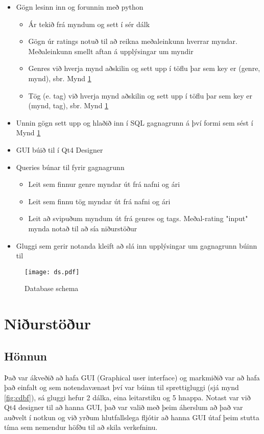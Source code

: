 \documentclass[12pt, git, draft]{rureport}
\begin{document}
\begin{itemize}
	\item Gögn lesinn inn og forunnin með python
	\begin{itemize}
		\item Ár tekið frá myndum og sett í sér dálk
		\item Gögn úr ratings notuð til að reikna meðaleinkunn hverrar myndar. Meðaleinkunn smellt aftan á upplýsingar um myndir
		\item Genres við hverja mynd aðskilin og sett upp í töflu þar sem key er (genre, mynd), sbr. Mynd \ref{fig:dataschema}
		\item Tög (e. tag) við hverja mynd aðskilin og sett upp í töflu þar sem key er (mynd, tag), sbr. Mynd \ref{fig:dataschema}
	\end{itemize}
	\item Unnin gögn sett upp og hlaðið inn í SQL gagnagrunn á því formi sem sést í Mynd \ref{fig:dataschema}
	\item GUI búið til í Qt4 Designer \cite{qt4}
	\item Queries búnar til fyrir gagnagrunn
	\begin{itemize}
		\item Leit sem finnur genre myndar út frá nafni og ári
		\item Leit sem finnu tög myndar út frá nafni og ári
		\item Leit að svipuðum myndum út frá genres og tags. Meðal-rating "input" mynda notað til að sía niðurstöður
	\end{itemize}
	\item Gluggi sem gerir notanda kleift að slá inn upplýsingar um gagnagrunn búinn til
\end{itemize}

\begin{figure}
	\centering 
	\texttt{[image: ds.pdf]}
	\caption{Database schema \label{fig:dataschema}}
\end{figure} 

\section{Niðurstöður}\label{nidurstodur}
\subsection{Hönnun}
Það var ákveðið að hafa GUI (Graphical user interface) og markmiðið var að hafa það einfalt og sem notendavænast því var búinn til sprettigluggi (sjá mynd \ref{fig:cdbf}), sá gluggi hefur 2 dálka, eina leitarstiku og 5 hnappa. Notast var við Qt4 designer til að hanna GUI, það var valið með þeim áherslum að það var auðvelt í notkun og við yrðum hlutfallslega fljótir að hanna GUI útaf þeim stutta tíma sem nemendur höfðu til að skila verkefninu.
\end{document}
